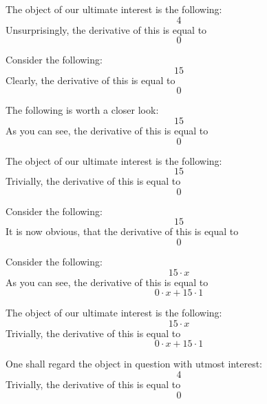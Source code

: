 \documentclass{article}
\begin{document}
The object of our ultimate interest is the following:
\begin{equation}
4 
\end{equation}
Unsurprisingly, the derivative of this is equal to
\begin{equation}
0 
\end{equation}

Consider the following:
\begin{equation}
15 
\end{equation}
Clearly, the derivative of this is equal to
\begin{equation}
0 
\end{equation}

The following is worth a closer look:
\begin{equation}
15 
\end{equation}
As you can see, the derivative of this is equal to
\begin{equation}
0 
\end{equation}

The object of our ultimate interest is the following:
\begin{equation}
15 
\end{equation}
Trivially, the derivative of this is equal to
\begin{equation}
0 
\end{equation}

Consider the following:
\begin{equation}
15 
\end{equation}
It is now obvious, that the derivative of this is equal to
\begin{equation}
0 
\end{equation}

Consider the following:
\begin{equation}
15 \cdot x 
\end{equation}
As you can see, the derivative of this is equal to
\begin{equation}
0 \cdot x + 15 \cdot 1 
\end{equation}

The object of our ultimate interest is the following:
\begin{equation}
15 \cdot x 
\end{equation}
Trivially, the derivative of this is equal to
\begin{equation}
0 \cdot x + 15 \cdot 1 
\end{equation}

One shall regard the object in question with utmost interest:
\begin{equation}
4 
\end{equation}
Trivially, the derivative of this is equal to
\begin{equation}
0 
\end{equation}
\end{document}

